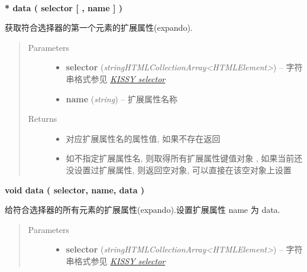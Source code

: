 \documentclass[letterpaper,10pt,english]{sphinxmanual}
\begin{document}
\begin{fulllineitems}
\label{api/core/dom/data:DOM.data}~
\begin{DUlineblock}{0em}
\item[] \textbf{* data ( selector {[} , name {]} )}
\item[] 获取符合选择器的第一个元素的扩展属性(expando).
\end{DUlineblock}
\begin{quote}\begin{description}
\item[{Parameters}] \leavevmode\begin{itemize}
\item {}
\textbf{selector} (\emph{string\textbar{}HTMLCollection\textbar{}Array\textless{}HTMLElement\textgreater{}}) -- 字符串格式参见 {\hyperref[api/core/dom/selector:dom-selector]{\emph{KISSY selector}}}

\item {}
\textbf{name} (\emph{string}) -- 扩展属性名称

\end{itemize}

\item[{Returns}] \leavevmode
\begin{itemize}
\item {}
对应扩展属性名的属性值, 如果不存在返回 

\item {}
如不指定扩展属性名, 则取得所有扩展属性键值对象 , 如果当前还没设置过扩展属性, 则返回空对象, 可以直接在该空对象上设置

\end{itemize}


\end{description}\end{quote}

\begin{DUlineblock}{0em}
\item[] \textbf{void data ( selector, name, data )}
\item[] 给符合选择器的所有元素的扩展属性(expando).设置扩展属性 name 为 data.
\end{DUlineblock}
\begin{quote}\begin{description}
\item[{Parameters}] \leavevmode\begin{itemize}
\item {}
\textbf{selector} (\emph{string\textbar{}HTMLCollection\textbar{}Array\textless{}HTMLElement\textgreater{}}) -- 字符串格式参见 {\hyperref[api/core/dom/selector:dom-selector]{\emph{KISSY selector}}}


\end{itemize}
\end{description}
\end{quote}
\end{fulllineitems}
\end{document}
